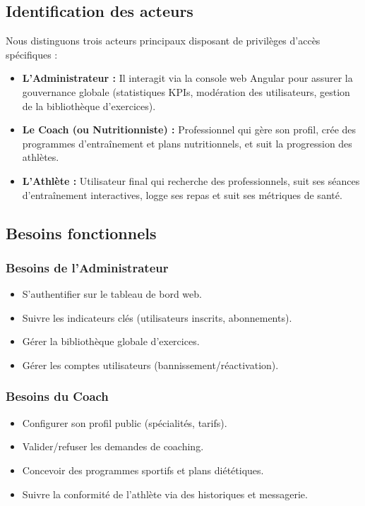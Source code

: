\subsection{Identification des acteurs}
Nous distinguons trois acteurs principaux disposant de privilèges d'accès spécifiques :
\begin{itemize}
    \item \textbf{L’Administrateur :} Il interagit via la console web Angular pour assurer la gouvernance globale (statistiques KPIs, modération des utilisateurs, gestion de la bibliothèque d'exercices).
    \item \textbf{Le Coach (ou Nutritionniste) :} Professionnel qui gère son profil, crée des programmes d'entraînement et plans nutritionnels, et suit la progression des athlètes.
    \item \textbf{L’Athlète :} Utilisateur final qui recherche des professionnels, suit ses séances d'entraînement interactives, logge ses repas et suit ses métriques de santé.
\end{itemize}

\subsection{Besoins fonctionnels}
\subsubsection{Besoins de l'Administrateur}
\begin{itemize}
    \item S'authentifier sur le tableau de bord web.
    \item Suivre les indicateurs clés (utilisateurs inscrits, abonnements).
    \item Gérer la bibliothèque globale d'exercices.
    \item Gérer les comptes utilisateurs (bannissement/réactivation).
\end{itemize}

\subsubsection{Besoins du Coach}
\begin{itemize}
    \item Configurer son profil public (spécialités, tarifs).
    \item Valider/refuser les demandes de coaching.
    \item Concevoir des programmes sportifs et plans diététiques.
    \item Suivre la conformité de l'athlète via des historiques et messagerie.
\end{itemize}

